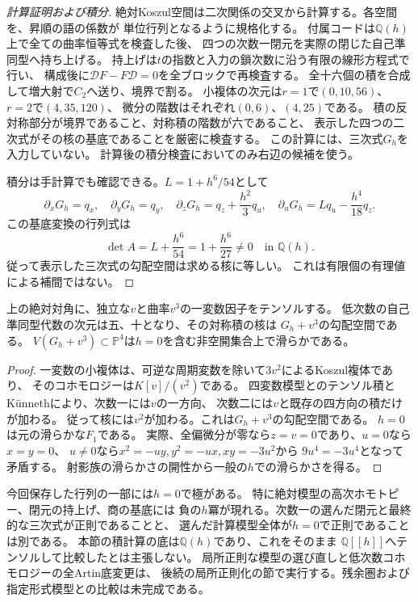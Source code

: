 \begin{proof}[計算証明および積分]
絶対Koszul空間は二次関係の交叉から計算する。各空間を、昇順の語の係数が
単位行列となるように規格化する。
付属コードは$\mathbb Q(h)$上で全ての曲率恒等式を検査した後、
四つの次数一閉元を実際の閉じた自己準同型へ持ち上げる。
持上げは$t$の指数と入力の鎖次数に沿う有限の線形方程式で行い、
構成後に$\mathcal DF-F\mathcal D=0$を全ブロックで再検査する。
全十六個の積を合成して増大射で$C_2$へ送り、境界で割る。
小複体の次元は$r=1$で$(0,10,56)$、$r=2$で$(4,35,120)$、
微分の階数はそれぞれ$(0,6)$、$(4,25)$である。
積の反対称部分が境界であること、対称積の階数が六であること、
表示した四つの二次式がその核の基底であることを厳密に検査する。
この計算には、三次式$G_h$を入力していない。
計算後の積分検査においてのみ右辺の候補を使う。

積分は手計算でも確認できる。$L=1+h^6/54$として
\[
 \partial_xG_h=q_x,\quad \partial_yG_h=q_y,\quad
 \partial_zG_h=q_z+\frac{h^2}{3}q_u,\quad
 \partial_uG_h=Lq_u-\frac{h^4}{18}q_z.
\]
この基底変換の行列式は
\[
 \det A=L+\frac{h^6}{54}=1+\frac{h^6}{27}\ne0
 \quad\text{in }\mathbb Q(h).
\]
従って表示した三次式の勾配空間は求める核に等しい。
これは有限個の有理値による補間ではない。
\end{proof}

\begin{corollary}[五変数の代数的候補]
上の絶対対角に、独立な$v$と曲率$v^3$の一変数因子をテンソルする。
低次数の自己準同型代数の次元は五、十となり、その対称積の核は
$G_h+v^3$の勾配空間である。
$V(G_h+v^3)\subset\mathbb P^4$は$h=0$を含む非空開集合上で滑らかである。
\end{corollary}
\begin{proof}
一変数の小複体は、可逆な周期変数を除いて$3v^2$によるKoszul複体であり、
そのコホモロジーは$K[v]/(v^2)$である。
四変数模型とのテンソル積とK\"unnethにより、次数一には$v$の一方向、
次数二には$v$と既存の四方向の積だけが加わる。
従って核には$v^2$が加わる。これは$G_h+v^3$の勾配空間である。
$h=0$は元の滑らかな$F_1$である。
実際、全偏微分が零なら$z=v=0$であり、$u=0$なら$x=y=0$、
$u\ne0$なら$x^2=-uy,y^2=-ux,xy=-3u^2$から
$9u^4=-3u^4$となって矛盾する。
射影族の滑らかさの開性から一般の$h$での滑らかさを得る。
\end{proof}

\begin{remark}[generic計算と局所正則化]
今回保存した行列の一部には$h=0$で極がある。
特に絶対模型の高次ホモトピー、閉元の持上げ、商の基底には
負の$h$冪が現れる。次数一の選んだ閉元と最終的な三次式が正則であることと、
選んだ計算模型全体が$h=0$で正則であることは別である。
本節の積計算の底は$\mathbb Q(h)$であり、これをそのまま
$\mathbb Q[[h]]$へテンソルして比較したとは主張しない。
局所正則な模型の選び直しと低次数コホモロジーの全Artin底変更は、
後続の局所正則化の節で実行する。残余圏および指定形式模型との比較は未完成である。
\end{remark}

